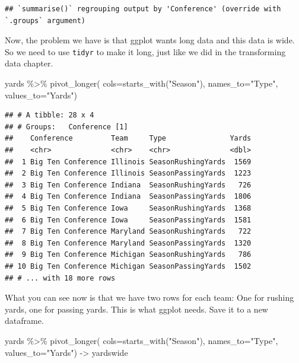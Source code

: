 \documentclass[
]{book}
\newenvironment{Shaded}{\begin{snugshade}}{\end{snugshade}}
\newcommand{\AttributeTok}[1]{\textcolor[rgb]{0.77,0.63,0.00}{#1}}
\newcommand{\FunctionTok}[1]{\textcolor[rgb]{0.00,0.00,0.00}{#1}}
\newcommand{\NormalTok}[1]{#1}
\newcommand{\OtherTok}[1]{\textcolor[rgb]{0.56,0.35,0.01}{#1}}
\newcommand{\SpecialCharTok}[1]{\textcolor[rgb]{0.00,0.00,0.00}{#1}}
\newcommand{\StringTok}[1]{\textcolor[rgb]{0.31,0.60,0.02}{#1}}
\begin{document}
\begin{verbatim}
## `summarise()` regrouping output by 'Conference' (override with `.groups` argument)
\end{verbatim}

Now, the problem we have is that ggplot wants long data and this data is wide. So we need to use \texttt{tidyr} to make it long, just like we did in the transforming data chapter.

\begin{Shaded}
\begin{Highlighting}[]
\NormalTok{yards }\SpecialCharTok{\%\textgreater{}\%} 
  \FunctionTok{pivot\_longer}\NormalTok{(}
    \AttributeTok{cols=}\FunctionTok{starts\_with}\NormalTok{(}\StringTok{"Season"}\NormalTok{), }
    \AttributeTok{names\_to=}\StringTok{"Type"}\NormalTok{, }
    \AttributeTok{values\_to=}\StringTok{"Yards"}\NormalTok{)}
\end{Highlighting}
\end{Shaded}

\begin{verbatim}
## # A tibble: 28 x 4
## # Groups:   Conference [1]
##    Conference         Team     Type               Yards
##    <chr>              <chr>    <chr>              <dbl>
##  1 Big Ten Conference Illinois SeasonRushingYards  1569
##  2 Big Ten Conference Illinois SeasonPassingYards  1223
##  3 Big Ten Conference Indiana  SeasonRushingYards   726
##  4 Big Ten Conference Indiana  SeasonPassingYards  1806
##  5 Big Ten Conference Iowa     SeasonRushingYards  1368
##  6 Big Ten Conference Iowa     SeasonPassingYards  1581
##  7 Big Ten Conference Maryland SeasonRushingYards   722
##  8 Big Ten Conference Maryland SeasonPassingYards  1320
##  9 Big Ten Conference Michigan SeasonRushingYards   786
## 10 Big Ten Conference Michigan SeasonPassingYards  1502
## # ... with 18 more rows
\end{verbatim}

What you can see now is that we have two rows for each team: One for rushing yards, one for passing yards. This is what ggplot needs. Save it to a new dataframe.

\begin{Shaded}
\begin{Highlighting}[]
\NormalTok{yards }\SpecialCharTok{\%\textgreater{}\%} 
  \FunctionTok{pivot\_longer}\NormalTok{(}
    \AttributeTok{cols=}\FunctionTok{starts\_with}\NormalTok{(}\StringTok{"Season"}\NormalTok{), }
    \AttributeTok{names\_to=}\StringTok{"Type"}\NormalTok{, }
    \AttributeTok{values\_to=}\StringTok{"Yards"}\NormalTok{) }\OtherTok{{-}\textgreater{}}\NormalTok{ yardswide}
\end{Highlighting}
\end{Shaded}
\end{document}
